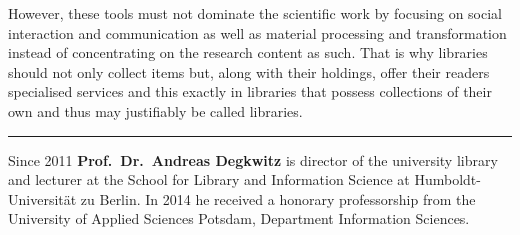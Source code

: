 \documentclass[a4paper,
fontsize=11pt,
oneside,
numbers=noperiodatend,
parskip=half-,
bibliography=totoc,
final
]{scrartcl}
\begin{document}
However, these tools must not dominate the scientific work by focusing
on social interaction and communication as well as material processing
and transformation instead of concentrating on the research content as
such. That is why libraries should not only collect items but, along
with their holdings, offer their readers specialised services and this
exactly in libraries that possess collections of their own and thus may
justifiably be called libraries.

\begin{center}\rule{0.5\linewidth}{\linethickness}\end{center}

Since 2011 \textbf{Prof.~Dr.~Andreas Degkwitz} is director of the
university library and lecturer at the School for Library and
Information Science at Humboldt-Universität zu Berlin. In 2014 he
received a honorary professorship from the University of Applied
Sciences Potsdam, Department Information Sciences.
\end{document}

